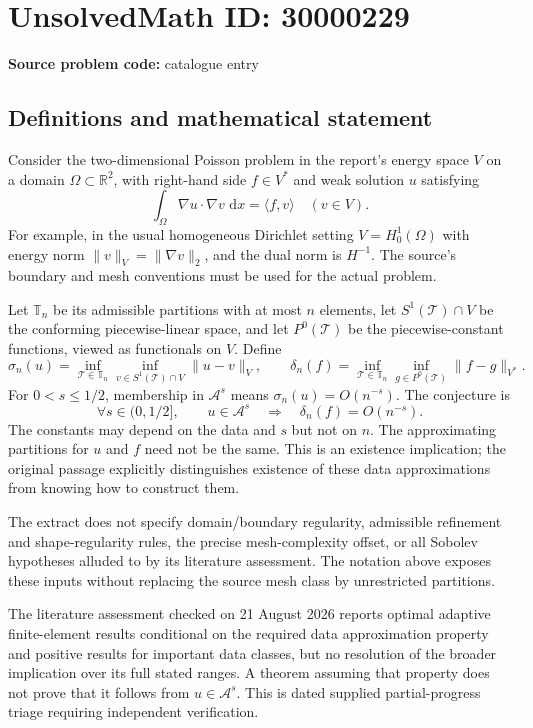 \documentclass[11pt]{article}
\newcommand{\R}{\mathbb{R}}
\newcommand{\dd}{\,\mathrm{d}}
\begin{document}
\section*{UnsolvedMath ID: 30000229}
\textbf{Source problem code:} catalogue entry
\subsection{Definitions and mathematical statement}
Consider the two-dimensional Poisson problem in the report's energy space $V$ on a domain $\Omega\subset\R^2$, with right-hand side $f\in V^*$ and weak solution $u$ satisfying
\[
 \int_\Omega\nabla u\cdot\nabla v\,\dd x=\langle f,v\rangle
 \quad(v\in V).
\]
For example, in the usual homogeneous Dirichlet setting $V=H_0^1(\Omega)$ with energy norm $\|v\|_V=\|\nabla v\|_2$, and the dual norm is $H^{-1}$. The source's boundary and mesh conventions must be used for the actual problem.

Let $\mathbb T_n$ be its admissible partitions with at most $n$ elements, let $S^1(\mathcal T)\cap V$ be the conforming piecewise-linear space, and let $P^0(\mathcal T)$ be the piecewise-constant functions, viewed as functionals on $V$. Define
\[
 \sigma_n(u)=\inf_{\mathcal T\in\mathbb T_n}
              \inf_{v\in S^1(\mathcal T)\cap V}\|u-v\|_V,
 \qquad
 \delta_n(f)=\inf_{\mathcal T\in\mathbb T_n}
              \inf_{g\in P^0(\mathcal T)}\|f-g\|_{V^*}.
\]
For $0<s\le1/2$, membership in $\mathcal A^s$ means $\sigma_n(u)=O(n^{-s})$. The conjecture is
\[
 \forall s\in(0,1/2],\qquad
 u\in\mathcal A^s\quad\Longrightarrow\quad\delta_n(f)=O(n^{-s}).
\]
The constants may depend on the data and $s$ but not on $n$. The approximating partitions for $u$ and $f$ need not be the same. This is an existence implication; the original passage explicitly distinguishes existence of these data approximations from knowing how to construct them.

The extract does not specify domain/boundary regularity, admissible refinement and shape-regularity rules, the precise mesh-complexity offset, or all Sobolev hypotheses alluded to by its literature assessment. The notation above exposes these inputs without replacing the source mesh class by unrestricted partitions.

The literature assessment checked on 21 August 2026 reports optimal adaptive finite-element results conditional on the required data approximation property and positive results for important data classes, but no resolution of the broader implication over its full stated ranges. A theorem assuming that property does not prove that it follows from $u\in\mathcal A^s$. This is dated supplied partial-progress triage requiring independent verification.
\end{document}
